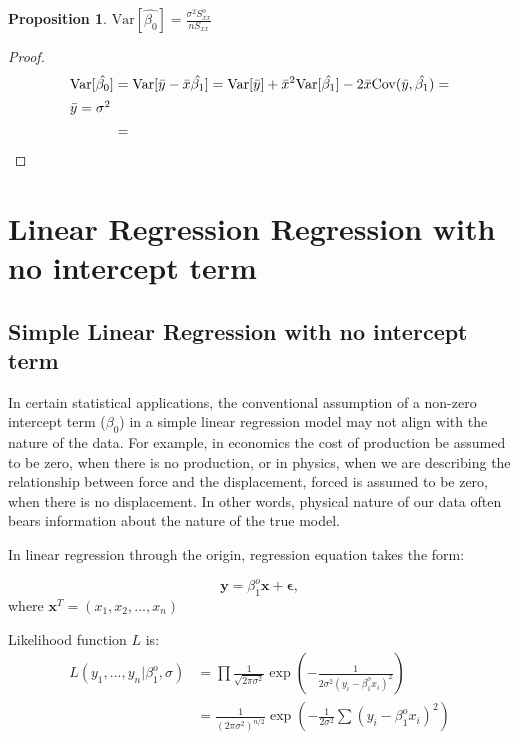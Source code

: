 \documentclass[12pt,a4paper,oneside]{book} %
\newtheorem{proposition}[theorem]{Proposition}
\newcommand{\Var}{\mathrm{Var}}
\newcommand{\Cov}{\mathrm{Cov}}
\begin{document}
\begin{proposition}
	$\Var [\hat{\beta_0}]= \frac{\sigma^2 S_{xx}^o}{n S_{xx}} $
\end{proposition}



\begin{proof}
	\begin{align*}
		\Var [\hat{\beta_0}] &= \Var [\bar{y}- \bar{x}\hat{\beta_1}] = \Var [\bar{y}] + \bar{x}^2 \Var [\hat{\beta_1}]- 2\bar{x} \Cov (\bar{y}, \hat{\beta_1}) = \\ 
		\intertext{$\bar{y}=\sigma^2$}
		&= 
	\end{align*}
\end{proof}

	\clearpage





\chapter{Linear Regression Regression with no intercept term}

	\section{Simple Linear Regression with no intercept term}

	In certain statistical applications, the conventional assumption of a non-zero intercept term ($\beta_0$) in a simple linear regression model may not align with the nature of the data. For example, in economics the cost of production be assumed to be zero, when there is no production, or in physics, when we are describing the relationship between force and the displacement, forced is assumed to be zero, when there is no displacement. In other words, physical nature of our data often bears information about the nature of the true model. 
	
	
	In linear regression through the origin, regression equation takes the form:
	
	\begin{equation}
		\mathbf{y} = \beta_1^o \mathbf{x} + \mathbf{\epsilon},
	\end{equation}
	where $\mathbf{x}^T=(x_1,x_2,...,x_n)$
	
	
	
	Likelihood function $L$ is:
	\begin{align*}
		L(y_1,...,y_n | \beta_1^o, \sigma) &= \prod \frac{1}{\sqrt{2 \pi \sigma^2}} \exp(-\frac{1}{2\sigma^2 (y_i-\beta_1^o x_i)^2}) \\
		&= \frac{1}{(2\pi \sigma^2)^{n/2}}\exp(-\frac{1}{2\sigma^2} \sum (y_i-\beta_1^o x_i)^2)
	\end{align*}
\end{document}
